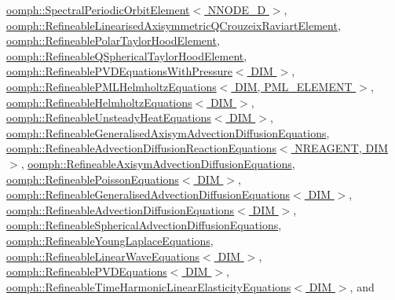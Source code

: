 \hyperlink{classoomph_1_1SpectralPeriodicOrbitElement_a49dfdd0687d3a3ad27c1ae9e9074aea9}{oomph\+::\+Spectral\+Periodic\+Orbit\+Element$<$ N\+N\+O\+D\+E\+\_\+D $>$}, \hyperlink{classoomph_1_1RefineableLinearisedAxisymmetricQCrouzeixRaviartElement_a46c6b74a900afc0038bcd4f6c33c6c47}{oomph\+::\+Refineable\+Linearised\+Axisymmetric\+Q\+Crouzeix\+Raviart\+Element}, \hyperlink{classoomph_1_1RefineablePolarTaylorHoodElement_aef7e50cfaa3725eb0b6ae5268f2d1ed8}{oomph\+::\+Refineable\+Polar\+Taylor\+Hood\+Element}, \hyperlink{classoomph_1_1RefineableQSphericalTaylorHoodElement_a3ba40964e7d5153a3b5074ff215fe116}{oomph\+::\+Refineable\+Q\+Spherical\+Taylor\+Hood\+Element}, \hyperlink{classoomph_1_1RefineablePVDEquationsWithPressure_a15ee8b0656b7957c7063aefc3acc5d50}{oomph\+::\+Refineable\+P\+V\+D\+Equations\+With\+Pressure$<$ D\+I\+M $>$}, \hyperlink{classoomph_1_1RefineablePMLHelmholtzEquations_a67107290248b8f9d921a24c1fca94e47}{oomph\+::\+Refineable\+P\+M\+L\+Helmholtz\+Equations$<$ D\+I\+M, P\+M\+L\+\_\+\+E\+L\+E\+M\+E\+N\+T $>$}, \hyperlink{classoomph_1_1RefineableHelmholtzEquations_aa9296bdeeb5699a279afb3813c81024f}{oomph\+::\+Refineable\+Helmholtz\+Equations$<$ D\+I\+M $>$}, \hyperlink{classoomph_1_1RefineableUnsteadyHeatEquations_a661820fcf2bd6518717ec8d81649a8d7}{oomph\+::\+Refineable\+Unsteady\+Heat\+Equations$<$ D\+I\+M $>$}, \hyperlink{classoomph_1_1RefineableGeneralisedAxisymAdvectionDiffusionEquations_a2f7d7da51b9088a7e306692f709f9eed}{oomph\+::\+Refineable\+Generalised\+Axisym\+Advection\+Diffusion\+Equations}, \hyperlink{classoomph_1_1RefineableAdvectionDiffusionReactionEquations_aa73aae12983b44f1adb2ef19819abf19}{oomph\+::\+Refineable\+Advection\+Diffusion\+Reaction\+Equations$<$ N\+R\+E\+A\+G\+E\+N\+T, D\+I\+M $>$}, \hyperlink{classoomph_1_1RefineableAxisymAdvectionDiffusionEquations_abacbd89407f04f0e98ce22cabbe43930}{oomph\+::\+Refineable\+Axisym\+Advection\+Diffusion\+Equations}, \hyperlink{classoomph_1_1RefineablePoissonEquations_affb65cdad97b93f4eff2e2f804efac02}{oomph\+::\+Refineable\+Poisson\+Equations$<$ D\+I\+M $>$}, \hyperlink{classoomph_1_1RefineableGeneralisedAdvectionDiffusionEquations_abee0a8a1988d23678cab1566474c5be2}{oomph\+::\+Refineable\+Generalised\+Advection\+Diffusion\+Equations$<$ D\+I\+M $>$}, \hyperlink{classoomph_1_1RefineableAdvectionDiffusionEquations_a0a916bc1f20ff94e7feed984d41148fb}{oomph\+::\+Refineable\+Advection\+Diffusion\+Equations$<$ D\+I\+M $>$}, \hyperlink{classoomph_1_1RefineableSphericalAdvectionDiffusionEquations_a208a004e8b7403001400d7de2ebd692f}{oomph\+::\+Refineable\+Spherical\+Advection\+Diffusion\+Equations}, \hyperlink{classoomph_1_1RefineableYoungLaplaceEquations_a0fad7813f5ad8046353921f263c1af05}{oomph\+::\+Refineable\+Young\+Laplace\+Equations}, \hyperlink{classoomph_1_1RefineableLinearWaveEquations_a6e1d14ebf648099505632c4b3f9ba141}{oomph\+::\+Refineable\+Linear\+Wave\+Equations$<$ D\+I\+M $>$}, \hyperlink{classoomph_1_1RefineablePVDEquations_a94defe5e7d281500b191d8bae6cfb2f1}{oomph\+::\+Refineable\+P\+V\+D\+Equations$<$ D\+I\+M $>$}, \hyperlink{classoomph_1_1RefineableTimeHarmonicLinearElasticityEquations_a6e7ba2975f3e6023aebdb877ab0bb7ec}{oomph\+::\+Refineable\+Time\+Harmonic\+Linear\+Elasticity\+Equations$<$ D\+I\+M $>$}, and 